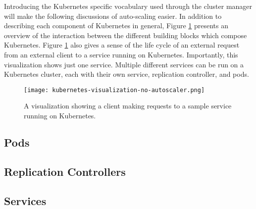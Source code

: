 Introducing the Kubernetes specific vocabulary used through the cluster manager
will make the following discussions of auto-scaling easier. In addition to
describing each component of Kubernetes in general, Figure
\ref{fig:kubernetes-visualization-no-autoscaler} presents an overview of the
interaction between the different building blocks which compose Kubernetes.
Figure \ref{fig:kubernetes-visualization-no-autoscaler} also gives a sense of
the life cycle of an external request from an external client
to a service running on Kubernetes.
Importantly, this visualization shows just one service. Multiple different
services can be run on a Kubernetes cluster, each with their own service,
replication controller, and pods.

\begin{figure}[!h]
  \centerline{\texttt{[image: kubernetes-visualization-no-autoscaler.png]}}
  \caption{A visualization showing a client making requests to a
  sample service running on Kubernetes.}
  \label{fig:kubernetes-visualization-no-autoscaler}
\end{figure}

\subsection{Pods}



\subsection{Replication Controllers}



\subsection{Services}


